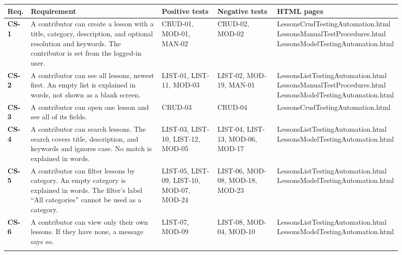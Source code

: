 \setlength{\tabcolsep}{4pt}\begin{longtable}{@{}>{\raggedright\arraybackslash}p{0.055\linewidth} >{\raggedright\arraybackslash}p{0.33\linewidth} >{\raggedright\arraybackslash}p{0.14\linewidth} >{\raggedright\arraybackslash}p{0.15\linewidth} >{\raggedright\arraybackslash}p{0.245\linewidth}@{}}
\toprule
\textbf{Req.} & \textbf{Requirement} & \textbf{Positive tests} & \textbf{Negative tests} & \textbf{HTML pages} \\
\midrule
\endhead
\textbf{CS-1} & A contributor can create a lesson with a title, category, description, and optional resolution and keywords. The contributor is set from the logged-in user. & CRUD-01, MOD-01, MAN-02 & CRUD-02, MOD-02 & \scriptsize LessonsCrudTestingAutomation.html \newline LessonsManualTestProcedures.html \newline LessonsModelTestingAutomation.html \\ \addlinespace[3pt]
\textbf{CS-2} & A contributor can see all lessons, newest first. An empty list is explained in words, not shown as a blank screen. & LIST-01, LIST-11, MOD-03 & LIST-02, MOD-19, MAN-01 & \scriptsize LessonsListTestingAutomation.html \newline LessonsManualTestProcedures.html \newline LessonsModelTestingAutomation.html \\ \addlinespace[3pt]
\textbf{CS-3} & A contributor can open one lesson and see all of its fields. & CRUD-03 & CRUD-04 & \scriptsize LessonsCrudTestingAutomation.html \\ \addlinespace[3pt]
\textbf{CS-4} & A contributor can search lessons. The search covers title, description, and keywords and ignores case. No match is explained in words. & LIST-03, LIST-10, LIST-12, MOD-05 & LIST-04, LIST-13, MOD-06, MOD-17 & \scriptsize LessonsListTestingAutomation.html \newline LessonsModelTestingAutomation.html \\ \addlinespace[3pt]
\textbf{CS-5} & A contributor can filter lessons by category. An empty category is explained in words. The filter's label “All categories” cannot be used as a category. & LIST-05, LIST-09, LIST-10, MOD-07, MOD-24 & LIST-06, MOD-08, MOD-18, MOD-23 & \scriptsize LessonsListTestingAutomation.html \newline LessonsModelTestingAutomation.html \\ \addlinespace[3pt]
\textbf{CS-6} & A contributor can view only their own lessons. If they have none, a message says so. & LIST-07, MOD-09 & LIST-08, MOD-04, MOD-10 & \scriptsize LessonsListTestingAutomation.html \newline LessonsModelTestingAutomation.html \\ \addlinespace[3pt]

\end{longtable}
